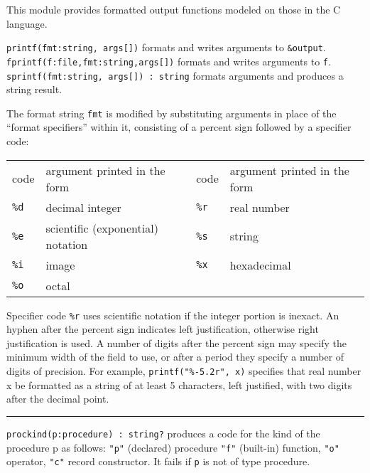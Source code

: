 This module provides formatted output functions
modeled on those in the C language.

\texttt{printf(fmt:string, args[])} formats and writes arguments to
\texttt{\&output}.\\
\texttt{fprintf(f:file,fmt:string,args[])} formats and writes arguments
to \texttt{f}.\\
\texttt{sprintf(fmt:string, args[]) : string} formats arguments and
produces a string result.

The format string \texttt{fmt} is modified by substituting arguments
in place of the ``format specifiers'' within it, consisting of a
percent sign followed by a specifier code:

\begin{xtabular}{m{0.5in} m{2.55in}m{0.5in}m{2.55in}}
code & argument printed in the form &
code & argument printed in the form \\
 \texttt{\%d}  & decimal integer        & \texttt{\%r}    & real number \\
 \texttt{\%e}  & scientific (exponential) notation & \texttt{\%s}    & string \\
 \texttt{\%i}  & image &          \texttt{\%x}    & hexadecimal \\
 \texttt{\%o}  & octal &           & \\
\end{xtabular}

Specifier code \texttt{\%r} uses scientific notation if the integer
portion is inexact.
An hyphen after the percent sign indicates left justification,
otherwise right justification is used. A number of digits after the
percent sign may specify the minimum width of the field to use, or after
a period they specify a number of digits of precision. For example,
\texttt{printf("\%-5.2r", x)} specifies that real number x be
formatted as a string of at least 5 characters, left justified,
with two digits after the decimal point.

\pagebreak


\vspace{0.25cm}\hrule{}

\texttt{prockind(p:procedure) : string?} produces a code for the kind of
the procedure p as follows: \texttt{"p"}
(declared) procedure \texttt{"f"}
(built-in) function, \texttt{"o"} operator,
\texttt{"c"} record
constructor. It fails if \texttt{p} is not of type
procedure. 

